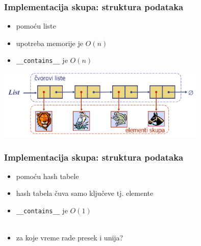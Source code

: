 \documentclass[compress,aspectratio=169]{beamer}
\begin{document}
\begin{frame}[fragile]
  \frametitle{Implementacija skupa: struktura podataka}
  \begin{itemize}
    \item pomoću liste
    \item upotreba memorije je $O(n)$
    \item \texttt{\_\_contains\_\_} je $O(n)$
  \end{itemize} 
  \begin{center}
    \includegraphics[width=10cm]{asp-10-pic16.png}
  \end{center}
\end{frame}

\begin{frame}[fragile]
  \frametitle{Implementacija skupa: struktura podataka}
  \begin{itemize}
    \item pomoću hash tabele
    \item hash tabela čuva samo ključeve tj. elemente
    \item \texttt{\_\_contains\_\_} je $O(1)$ \\ \ \\
    \item za koje vreme rade presek i unija?
  \end{itemize} 
\end{frame}
\end{document}
